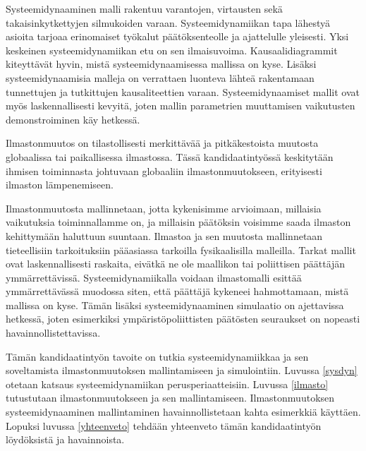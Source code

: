 \documentclass[finnish,12pt,a4paper,pdftex]{article}
\begin{document}
\begin{onehalfspacing}

Systeemidynaaminen malli rakentuu varantojen, virtausten sekä takaisinkytkettyjen silmukoiden varaan. Systeemidynamiikan tapa lähestyä asioita tarjoaa erinomaiset työkalut päätöksenteolle ja ajattelulle yleisesti. Yksi keskeinen systeemidynamiikan etu on sen ilmaisuvoima. Kausaalidiagrammit kiteyttävät hyvin, mistä systeemidynaamisessa mallissa on kyse. Lisäksi systeemidynaamisia malleja on verrattaen luonteva lähteä rakentamaan tunnettujen ja tutkittujen kausaliteettien varaan. Systeemidynaamiset mallit ovat myös laskennallisesti kevyitä, joten mallin parametrien muuttamisen vaikutusten demonstroiminen käy hetkessä.  

Ilmastonmuutos on tilastollisesti merkittävää ja pitkäkestoista muutosta globaalissa tai paikallisessa ilmastossa. Tässä kandidaatintyössä keskitytään ihmisen toiminnasta johtuvaan globaaliin ilmastonmuutokseen, erityisesti ilmaston lämpenemiseen. 

Ilmastonmuutosta mallinnetaan, jotta kykenisimme arvioimaan, millaisia vaikutuksia toiminnallamme on, ja millaisin päätöksin voisimme saada ilmaston kehittymään haluttuun suuntaan. Ilmastoa ja sen muutosta mallinnetaan tieteellisiin tarkoituksiin pääasiassa tarkoilla fysikaalisilla malleilla. Tarkat mallit ovat laskennallisesti raskaita, eivätkä ne ole maallikon tai poliittisen päättäjän ymmärrettävissä. Systeemidynamiikalla voidaan ilmastomalli esittää ymmärrettävässä muodossa siten, että päättäjä kykeneei hahmottamaan, mistä mallissa on kyse. Tämän lisäksi systeemidynaaminen simulaatio on ajettavissa hetkessä, joten esimerkiksi ympäristöpoliittisten päätösten seuraukset on nopeasti havainnollistettavissa. 

Tämän kandidaatintyön tavoite on tutkia systeemidynamiikkaa ja sen soveltamista ilmastonmuutoksen mallintamiseen ja simulointiin. Luvussa \ref{sysdyn} otetaan katsaus systeemidynamiikan perusperiaatteisiin. Luvussa \ref{ilmasto} tutustutaan ilmastonmuutokseen ja sen mallintamiseen. Ilmastonmuutoksen systeemidynaaminen mallintaminen havainnollistetaan kahta esimerkkiä käyttäen. Lopuksi luvussa \ref{yhteenveto} tehdään yhteenveto tämän kandidaatintyön löydöksistä ja havainnoista. 


\clearpage


\end{onehalfspacing}
\end{document}
